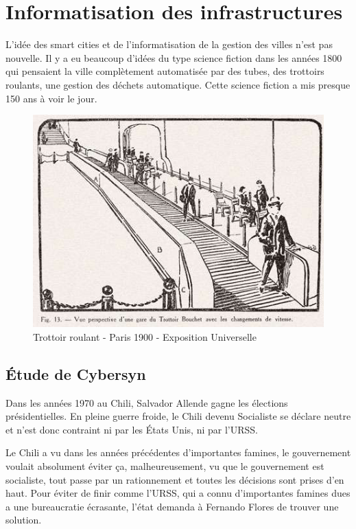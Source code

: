 \chapter{Informatisation des infrastructures}

L'idée des smart cities et de l'informatisation de la gestion des villes n'est pas nouvelle.
Il y a eu beaucoup d'idées du type science fiction dans les années 1800 qui pensaient la ville
complètement automatisée par des tubes, des trottoirs roulants, une gestion des déchets automatique.
Cette science fiction a mis presque 150 ans à voir le jour.

\begin{figure}[h]
  \centering
  \includegraphics[scale=0.30]{media/trottoir_roulant.jpg}
  \caption{Trottoir roulant - Paris 1900 - Exposition Universelle}
\end{figure}

\section{Étude de Cybersyn}

Dans les années 1970 au Chili, Salvador Allende gagne les élections présidentielles.
En pleine guerre froide, le Chili devenu Socialiste se déclare neutre et n'est donc
contraint ni par les États Unis, ni par l'URSS.

Le Chili a vu dans les années précédentes d'importantes famines, le gouvernement voulait
absolument éviter ça, malheureusement, vu que le gouvernement est socialiste, tout passe
par un rationnement et toutes les décisions sont prises d'en haut.
Pour éviter de finir comme l'URSS, qui a connu d'importantes famines dues a une
bureaucratie écrasante, l'état demanda à Fernando Flores de trouver une solution.


